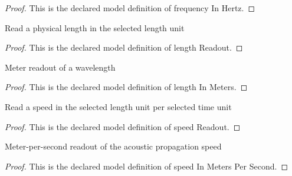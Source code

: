 \begin{proof}
  This is the declared model definition of frequency In Hertz.
\end{proof}
\begin{definition}
  \label{def:physics:phyx-mini-0190:phyxminiproblems-problemphyxmini0190-lengthreadout}
  Read a physical length in the selected length unit
\end{definition}
\begin{proof}
  This is the declared model definition of length Readout.
\end{proof}
\begin{definition}
  \label{def:physics:phyx-mini-0190:phyxminiproblems-problemphyxmini0190-lengthinmeters}
  Meter readout of a wavelength
\end{definition}
\begin{proof}
  This is the declared model definition of length In Meters.
\end{proof}
\begin{definition}
  \label{def:physics:phyx-mini-0190:phyxminiproblems-problemphyxmini0190-speedreadout}
  Read a speed in the selected length unit per selected time unit
\end{definition}
\begin{proof}
  This is the declared model definition of speed Readout.
\end{proof}
\begin{definition}
  \label{def:physics:phyx-mini-0190:phyxminiproblems-problemphyxmini0190-speedinmeterspersecond}
  Meter-per-second readout of the acoustic propagation speed
\end{definition}
\begin{proof}
  This is the declared model definition of speed In Meters Per Second.
\end{proof}
